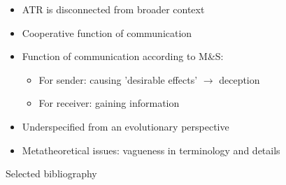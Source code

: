 \documentclass[xcolor=table]{beamer}       %
\begin{document}
\begin{frame}{\insertsection}
    \begin{itemize}
        \item ATR is disconnected from broader context
        \item Cooperative function of communication
        \item Function of communication according to M\&S:
            \begin{itemize}
                \item For sender: causing 'desirable effects' $\to$ deception
                \item For receiver: gaining information
            \end{itemize}
        \item Underspecified from an evolutionary perspective
        \item Metatheoretical issues: vagueness in terminology and details
    \end{itemize}
\end{frame}

\begin{frame}{Selected bibliography}
    \nocite{Scott-Phillips08, MS11, Tomasello09, Sperber01, Sperber10, Ayala99}
    \printbibliography
\end{frame}
\end{document}
